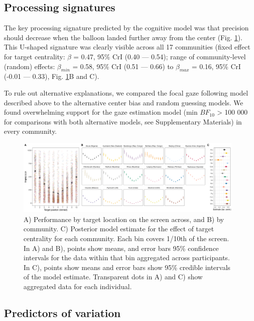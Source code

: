 \documentclass[
  man,floatsintext]{apa7}
\begin{document}
\subsection{Processing signatures}\label{processing-signatures-1}

The key processing signature predicted by the cognitive model was that precision should decrease when the balloon landed further away from the center (Fig. \ref{fig:fig4}). This U-shaped signature was clearly visible across all 17 communities (fixed effect for target centrality: \(\beta\) = 0.47, 95\% CrI (0.40 --- 0.54); range of community-level (random) effects: \(\beta_{min}\) = 0.58, 95\% CrI (0.51 --- 0.66) to \(\beta_{max}\) = 0.16, 95\% CrI (-0.01 --- 0.33), Fig. \ref{fig:fig4}B and C).

To rule out alternative explanations, we compared the focal gaze following model described above to the alternative center bias and random guessing models. We found overwhelming support for the gaze estimation model (min \(BF_{10}\) \textgreater{} 100 000 for comparisons with both alternative models, see Supplementary Materials) in every community.

\begin{figure}
\includegraphics[width=1\linewidth]{../figures/ptc} \caption{A) Performance by target location on the screen across, and B) by community. C) Posterior model estimate for the effect of target centrality for each community. Each bin covers 1/10th of the screen. In A) and B), points show means, and error bars 95\% confidence intervals for the data within that bin aggregated across participants. In C), points show means and error bars show 95\% credible intervals of the model estimate. Transparent dots in A) and C) show aggregated data for each individual.}\label{fig:fig4}
\end{figure}

\subsection{Predictors of variation}\label{predictors-of-variation-1}
\end{document}
